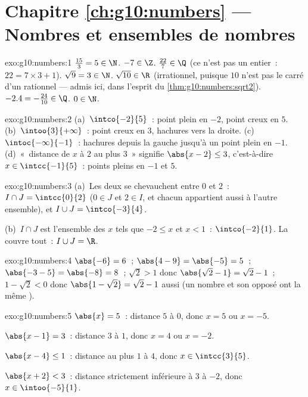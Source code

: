 \section*{Chapitre \ref{ch:g10:numbers} --- Nombres et ensembles de nombres}

\begin{solution}{exo:g10:numbers:1}
$\frac{15}{3} = 5 \in \N$. \quad $-7 \in \Z$. \quad
$\frac{22}{7} \in \Q$ (ce n'est pas un entier~: $22 = 7 \times 3 + 1$).
\quad $\sqrt 9 = 3 \in \N$. \quad $\sqrt{10} \in \R$ (irrationnel,
puisque $10$ n'est pas le carré d'un rationnel --- admis ici, dans
l'esprit du \cref{thm:g10:numbers:sqrt2}). \quad
$-2.4 = -\frac{24}{10} \in \Q$. \quad $0 \in \N$.
\end{solution}

\begin{solution}{exo:g10:numbers:2}
(a)~$\intco{-2}{5}$~: point plein en $-2$, point creux en $5$.
(b)~$\intoo{3}{+\infty}$~: point creux en $3$, hachures vers la droite.
(c)~$\intoc{-\infty}{-1}$~: hachures depuis la gauche jusqu'à un point
plein en $-1$.
(d)~«~distance de $x$ à $2$ au plus $3$~» signifie
$\abs{x - 2} \leq 3$, c'est-à-dire $x \in \intcc{-1}{5}$~: points
pleins en $-1$ et $5$.
\end{solution}

\begin{solution}{exo:g10:numbers:3}
(a)~Les deux  se chevauchent entre $0$ et $2$~:
$I \cap J = \intcc{0}{2}$ ($0 \in J$ et $2 \in I$, et chacun
appartient aussi à l'autre ensemble), et
$I \cup J = \intco{-3}{4}$.

(b)~$I \cap J$ est l'ensemble des $x$ tels que $-2 \leq x$ et
$x < 1$~: $\intco{-2}{1}$. La  couvre tout~:
$I \cup J = \R$.
\end{solution}

\begin{solution}{exo:g10:numbers:4}
$\abs{-6} = 6$~; \quad $\abs{4 - 9} = \abs{-5} = 5$~; \quad
$\abs{-3 - 5} = \abs{-8} = 8$~; \quad
$\sqrt 2 > 1$ donc $\abs{\sqrt2 - 1} = \sqrt2 - 1$~; \quad
$1 - \sqrt2 < 0$ donc $\abs{1 - \sqrt2} = \sqrt2 - 1$ aussi (un
nombre et son opposé ont la même ).
\end{solution}

\begin{solution}{exo:g10:numbers:5}
$\abs{x} = 5$~: distance $5$ à $0$, donc $x = 5$ ou $x = -5$.

$\abs{x - 1} = 3$~: distance $3$ à $1$, donc $x = 4$ ou $x = -2$.

$\abs{x - 4} \leq 1$~: distance au plus $1$ à $4$, donc
$x \in \intcc{3}{5}$.

$\abs{x + 2} < 3$~: distance strictement inférieure à $3$ à $-2$,
donc $x \in \intoo{-5}{1}$.
\end{solution}

